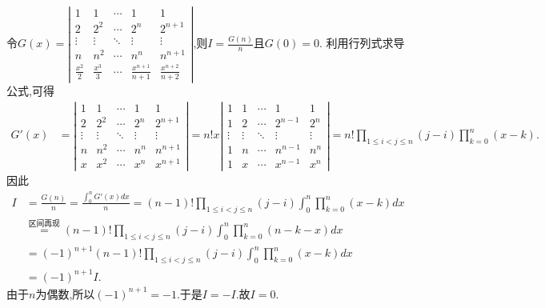 \documentclass[lang=cn,newtx,10pt,scheme=chinese]{elegantbook}
\begin{document}
\begin{solution}
令\(G(x)=\left|\begin{matrix}
        1 & 1 & \cdots & 1 & 1\\
        2 & 2^2 & \cdots & 2^n & 2^{n + 1}\\
        \vdots & \vdots & \ddots & \vdots & \vdots\\
        n & n^2 & \cdots & n^n & n^{n + 1}\\
        \frac{x^2}{2} & \frac{x^3}{3} & \cdots & \frac{x^{n + 1}}{n + 1} & \frac{x^{n + 2}}{n + 2}
\end{matrix}\right|\),则\(I = \frac{G(n)}{n}\)且\(G(0) = 0\).      
利用行列式求导公式,可得
\begin{align*}
    G'(x)&=\left|\begin{matrix}
        1 & 1 & \cdots & 1 & 1\\
        2 & 2^2 & \cdots & 2^n & 2^{n + 1}\\
        \vdots & \vdots & \ddots & \vdots & \vdots\\
        n & n^2 & \cdots & n^n & n^{n + 1}\\
        x & x^2 & \cdots & x^n & x^{n + 1}
        \end{matrix}\right|
        = n!x\left|\begin{matrix}
        1 & 1 & \cdots & 1 & 1\\
        1 & 2 & \cdots & 2^{n - 1} & 2^n\\
        \vdots & \vdots & \ddots & \vdots & \vdots\\
        1 & n & \cdots & n^{n - 1} & n^n\\
        1 & x & \cdots & x^{n - 1} & x^n
        \end{matrix}\right|
        = n!\prod_{1\leqslant i < j\leqslant n}(j - i)\prod_{k = 0}^{n}(x - k).
\end{align*}
        因此
\begin{align*}
    I &= \frac{G(n)}{n}=\frac{\int_{0}^{n}G'(x)dx}{n}=(n - 1)!\prod_{1\leqslant i < j\leqslant n}(j - i)\int_{0}^{n}\prod_{k = 0}^{n}(x - k)dx
    \\
    &\stackrel{\text{区间再现}}{=}(n - 1)!\prod_{1\leqslant i < j\leqslant n}(j - i)\int_{0}^{n}\prod_{k = 0}^{n}(n - k - x)dx
    \\
    &= (-1)^{n + 1}(n - 1)!\prod_{1\leqslant i < j\leqslant n}(j - i)\int_{0}^{n}\prod_{k = 0}^{n}(x - k)dx
    \\
    &= (-1)^{n + 1}I.
\end{align*}      
由于\(n\)为偶数,所以\((-1)^{n + 1} = -1\).于是\(I = -I\).故\(I = 0\). 
\end{solution}
\end{document}

